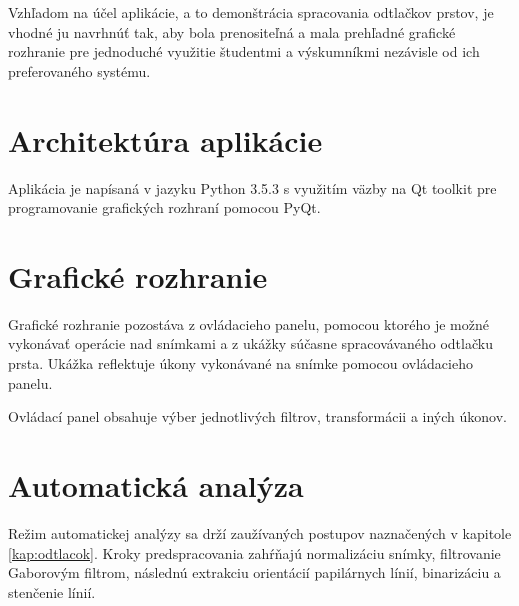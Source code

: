   Vzhľadom na účel aplikácie, a to demonštrácia spracovania odtlačkov prstov, je vhodné ju navrhnúť tak, aby bola prenositeľná a mala prehľadné 
  grafické rozhranie pre jednoduché využitie študentmi a výskumníkmi nezávisle od ich preferovaného systému.

  \section{Architektúra aplikácie}
  Aplikácia je napísaná v jazyku Python 3.5.3 s využitím väzby na Qt toolkit pre programovanie grafických rozhraní pomocou PyQt.
  

  \section{Grafické rozhranie}
  Grafické rozhranie pozostáva z ovládacieho panelu, pomocou ktorého je možné vykonávať operácie nad snímkami a z ukážky súčasne
  spracovávaného odtlačku prsta. Ukážka reflektuje úkony vykonávané na snímke pomocou ovládacieho panelu.

  Ovládací panel obsahuje výber jednotlivých filtrov, transformácii a iných úkonov. %

  \section{Automatická analýza}
  Režim automatickej analýzy sa drží zaužívaných postupov naznačených v kapitole \ref{kap:odtlacok}. Kroky predspracovania zahŕňajú 
  normalizáciu snímky, filtrovanie Gaborovým filtrom, následnú extrakciu orientácií papilárnych línií, binarizáciu a stenčenie línií.
  

